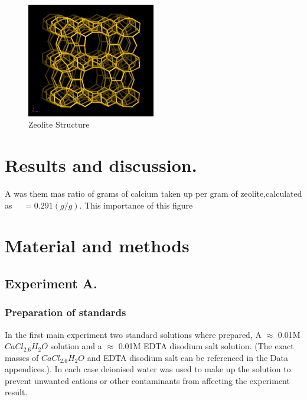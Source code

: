 \documentclass[]{article}
\begin{document}
\hypertarget{section}{%
\subsection{}\label{section}}

\begin{figure}
\centering
\includegraphics[width=0.5\textwidth,height=\textheight]{Images/ZeoliteStructure.jpg}
\caption{Zeolite Structure}
\end{figure}

\hypertarget{results-and-discussion.}{%
\section{Results and discussion.}\label{results-and-discussion.}}

A was them mas ratio of grams of calcium taken up per gram of
zeolite,calculated as \(\quad = 0.291 (g/g)\). This importance of this
figure

\hypertarget{material-and-methods}{%
\section{Material and methods}\label{material-and-methods}}

\hypertarget{experiment-a.}{%
\subsection{Experiment A.}\label{experiment-a.}}

\hypertarget{preparation-of-standards}{%
\subsubsection{Preparation of
standards}\label{preparation-of-standards}}

In the first main experiment two standard solutions where prepared, A
\(\approx\) 0.01M \(CaCl_2.6H_2O\) solution and a \(\approx\) 0.01M EDTA
disodium salt solution. (The exact masses of \(CaCl_2.6H_2O\) and EDTA
disodium salt can be referenced in the Data appendices.). In each case
deionised water was used to make up the solution to prevent unwanted
cations or other contaminants from affecting the experiment result.
\end{document}
